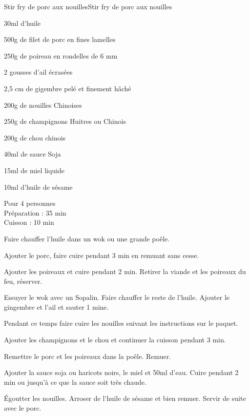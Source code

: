 \begin{recette}{Stir fry de porc aux nouilles}{Stir fry de porc aux nouilles}

\begin{ingredients}
30ml d'huile\par
500g de filet de porc en fines lamelles\par
250g de poireau en rondelles de 6 mm\par
2 gousses d'ail écrasées\par
2,5 cm de gigembre pelé et finement hâché\par
200g de nouilles Chinoises\par
250g de champignons Huitres ou Chinois\par
200g de chou chinois\par
40ml de sauce Soja\par
15ml de miel liquide\par
10ml d'huile de sésame\par
\end{ingredients}

\begin{infos}
Pour 4 personnes\\
Préparation : 35 min\\
Cuisson : 10 min\\
\end{infos}

\begin{etapes}
\item Faire chauffer l'huile dans un wok ou une grande poêle.
\item Ajouter le porc, faire cuire pendant 3 min en remuant sans cesse.
\item Ajouter les poireaux et cuire pendant 2 min. Retirer la viande et les poireaux du feu, réserver.
\item Essuyer le wok avec un Sopalin. Faire chauffer le reste de l'huile. Ajouter le gingembre et l'ail et sauter 1 mine.
\item Pendant ce temps faire cuire les nouilles suivant les instructions sur le paquet.
\item Ajouter les champignons et le chou et continuer la cuisson pendant 3 min.
\item Remettre le porc et les poireaux dans la poêle. Remuer.
\item Ajouter la sauce soja ou haricots noirs, le miel et 50ml d'eau. Cuire pendant 2 min ou jusqu'à ce que la sauce soit très chaude.
\item Égoutter les nouilles. Arroser de l'huile de sésame et bien remuer. Servir de suite avec le porc.
\end{etapes}

\end{recette}